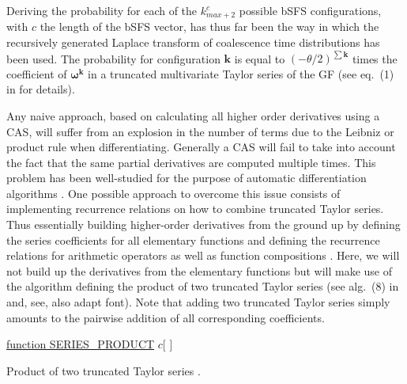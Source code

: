 \documentclass[10pt, a4]{article}
\begin{document}
Deriving the probability for each of the $k_{max + 2}^c$ possible bSFS configurations, with $c$ the length of the bSFS vector, has thus far been the way in which the recursively generated Laplace transform of coalescence time distributions has been used. The probability for configuration $\boldsymbol{k}$ is equal to $(-\theta/2)^{\sum \boldsymbol{k}}$ times the coefficient of $\boldsymbol{\omega}^{\boldsymbol{k}}$ in a truncated multivariate Taylor series of the GF (see eq.\ (1) in \citet{Lohse2011} for details).

Any naive approach, based on calculating all higher order derivatives using a CAS, will suffer from an explosion in the number of terms due to the Leibniz or product rule when differentiating. Generally a CAS will fail to take into account the fact that the same partial derivatives are computed multiple times. This problem has been well-studied for the purpose of automatic differentiation algorithms \citep{Neidinger1992, Neidinger1995, Griewank2000, Bettencourt2019}. One possible approach to overcome this issue consists of implementing recurrence relations on how to combine truncated Taylor series. Thus essentially building higher-order derivatives from the ground up by defining the series coefficients for all elementary functions and defining the recurrence relations for arithmetic operators as well as function compositions \citep{Neidinger2013}. Here, we will not build up the derivatives from the elementary functions but will make use of the algorithm defining the product of two truncated Taylor series (see alg.\ (8) in \citet{Neidinger2013} and, see,  also adapt font). Note that adding two truncated Taylor series simply amounts to the pairwise addition of all corresponding coefficients.

\begin{algorithm}\label{alg:product}

    \underline{function SERIES\_PRODUCT}\;
    \Return $c$[ ]\;
    \caption{Product of two truncated Taylor series \citep{Neidinger2013}.}
\end{algorithm}
\end{document}
